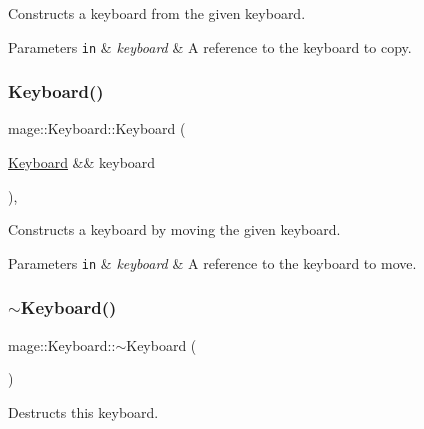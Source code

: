 Constructs a keyboard from the given keyboard.


\begin{DoxyParams}[1]{Parameters}
\mbox{\tt in}  & {\em keyboard} & A reference to the keyboard to copy. \\
\hline
\end{DoxyParams}
\hypertarget{classmage_1_1_keyboard_a011a8cf9a3a3f50800879f5bdfdead3f}{}\label{classmage_1_1_keyboard_a011a8cf9a3a3f50800879f5bdfdead3f} 
\subsubsection{\texorpdfstring{Keyboard()}{Keyboard()}\hspace{0.1cm}{\footnotesize\ttfamily [3/3]}}
{\footnotesize\ttfamily mage\+::\+Keyboard\+::\+Keyboard (\begin{DoxyParamCaption}\item[{\hyperlink{classmage_1_1_keyboard}{Keyboard} \&\&}]{keyboard }\end{DoxyParamCaption})\hspace{0.3cm}{\ttfamily [default]}, {\ttfamily [noexcept]}}

Constructs a keyboard by moving the given keyboard.


\begin{DoxyParams}[1]{Parameters}
\mbox{\tt in}  & {\em keyboard} & A reference to the keyboard to move. \\
\hline
\end{DoxyParams}
\hypertarget{classmage_1_1_keyboard_a80a84ec68749fac71690fb45287d446a}{}\label{classmage_1_1_keyboard_a80a84ec68749fac71690fb45287d446a} 
\subsubsection{\texorpdfstring{$\sim$\+Keyboard()}{~Keyboard()}}
{\footnotesize\ttfamily mage\+::\+Keyboard\+::$\sim$\+Keyboard (\begin{DoxyParamCaption}{ }\end{DoxyParamCaption})\hspace{0.3cm}{\ttfamily [default]}}

Destructs this keyboard. 

